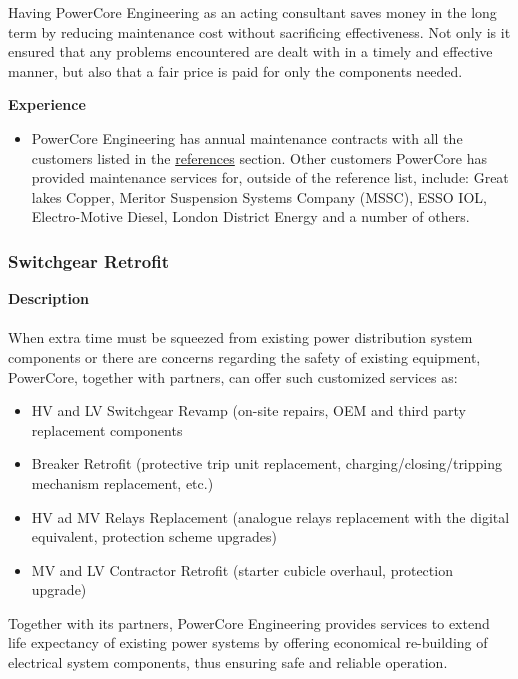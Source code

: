 Having PowerCore Engineering as an acting consultant saves money in the long term by reducing maintenance cost without sacrificing effectiveness. Not only is it ensured that any problems encountered are dealt with in a timely and effective manner, but also that a fair price is paid for only the components needed.

\textbf{Experience}\\
\begin{itemize}
	\item PowerCore Engineering has annual maintenance contracts with all the customers listed in the \hyperref[Sub:Ref]{references} section.  Other customers PowerCore has provided maintenance services for, outside of the reference list, include: Great lakes Copper, Meritor Suspension Systems Company (MSSC), ESSO IOL, Electro-Motive Diesel, London District Energy and a number of others.
\end{itemize}

\subsubsection{Switchgear Retrofit }
\label{Sub:Exp:SR}

\textbf{Description}\\
\\
When extra time must be squeezed from existing power distribution system components or there are concerns regarding the safety of existing equipment, PowerCore, together with partners, can offer such customized services as: 
\begin{itemize}
	\item HV and LV Switchgear Revamp (on-site repairs, OEM and third party replacement components
	\item Breaker Retrofit (protective trip unit replacement, charging/closing/tripping mechanism replacement, etc.)
	\item HV ad MV Relays Replacement (analogue relays replacement with the digital equivalent, protection scheme upgrades)
	\item MV and LV Contractor Retrofit (starter cubicle overhaul, protection upgrade)

\end{itemize}

Together with its partners, PowerCore Engineering provides services to extend life expectancy of existing power systems by offering economical re-building of electrical system components, thus ensuring safe and reliable operation.

